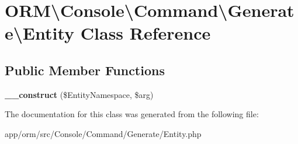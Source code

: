 \hypertarget{classORM_1_1Console_1_1Command_1_1Generate_1_1Entity}{}\section{O\+RM\textbackslash{}Console\textbackslash{}Command\textbackslash{}Generate\textbackslash{}Entity Class Reference}
\label{classORM_1_1Console_1_1Command_1_1Generate_1_1Entity}
\subsection*{Public Member Functions}
\begin{DoxyCompactItemize}
\item 
{\bfseries \+\_\+\+\_\+construct} (\$Entity\+Namespace, \$arg)\hypertarget{classORM_1_1Console_1_1Command_1_1Generate_1_1Entity_a2ffc346999de213700fdf227d3373fa1}{}\label{classORM_1_1Console_1_1Command_1_1Generate_1_1Entity_a2ffc346999de213700fdf227d3373fa1}

\end{DoxyCompactItemize}


The documentation for this class was generated from the following file\+:\begin{DoxyCompactItemize}
\item 
app/orm/src/\+Console/\+Command/\+Generate/Entity.\+php\end{DoxyCompactItemize}

